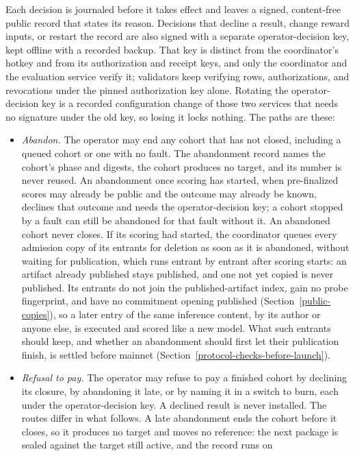 Each decision is journaled before it takes effect and leaves a signed,
content-free public record that states its reason. Decisions that decline a
result, change reward inputs, or restart the record are also signed with a
separate operator-decision key, kept offline with a recorded backup. That key is
distinct from the coordinator's hotkey and from its authorization and receipt
keys, and only the coordinator and the evaluation service verify it; validators
keep verifying rows, authorizations, and revocations under the pinned
authorization key alone. Rotating the operator-decision key is a recorded
configuration change of those two services that needs no signature under the
old key, so losing it locks nothing. The paths are these:
\begin{itemize}\tightlist
\item \emph{Abandon.} The operator may end any cohort that has not closed,
including a queued cohort or one with no fault. The abandonment record names the
cohort's phase and digests, the cohort produces no target, and its number is
never reused. An abandonment once scoring has started, when pre-finalized
scores may already be public and the outcome may already be known, declines
that outcome and needs the operator-decision key; a cohort stopped by a fault
can still be abandoned for that fault without it. An abandoned cohort never
closes. If its scoring had started, the coordinator queues every admission
copy of its entrants for deletion as soon as it is abandoned, without waiting
for publication, which runs entrant by entrant after scoring starts: an
artifact already published stays published, and one not yet copied is never
published. Its entrants do not join the published-artifact index, gain no
probe fingerprint, and have no commitment opening published
(Section~\ref{public-copies}), so a later entry of the same inference content,
by its author or anyone else, is executed and scored like a new model. What
such entrants should keep, and whether an abandonment should first let their
publication finish, is settled before mainnet
(Section~\ref{protocol-checks-before-launch}).
\item \emph{Refusal to pay.} The operator may refuse to pay a finished cohort by
declining its closure, by abandoning it late, or by naming it in a switch to
burn, each under the operator-decision key. A declined result is never
installed. The routes differ in what follows. A late abandonment ends the
cohort before it closes, so it produces no target and moves no reference: the
next package is sealed against the target still active, and the record runs on

\end{itemize}
